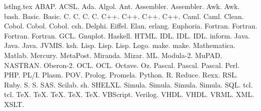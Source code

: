 \begin{filecontents}{lstlng.tex}
\lsttestlang ABAP.
\lsttestlang ACSL.
\lsttestlang Ada.
\lsttestlang Algol.
\lsttestlang Ant.
\lsttestlang Assembler.
\lsttestlang [x86masm]Assembler.
\lsttestlang [gnu]Awk.
\lsttestlang [POSIX]Awk.
\lsttestlang bash.
\lsttestlang Basic.
\lsttestlang [Visual]Basic.
\lsttestlang [ANSI]C.
\lsttestlang [Handel]C.
\lsttestlang [Objective]C.
\lsttestlang [Sharp]C.
\lsttestlang [ISO]C++.
\lsttestlang [ANSI]C++.
\lsttestlang [GNU]C++.
\lsttestlang [Visual]C++.
\lsttestlang [light]Caml.
\lsttestlang [Objective]Caml.
\lsttestlang Clean.
\lsttestlang [ibm]Cobol.
\lsttestlang [1974]Cobol.
\lsttestlang [1985]Cobol.
\lsttestlang csh.
\lsttestlang Delphi.
\lsttestlang Eiffel.
\lsttestlang Elan.
\lsttestlang erlang.
\lsttestlang Euphoria.
\lsttestlang Fortran.
\lsttestlang [77]Fortran.
\lsttestlang [90]Fortran.
\lsttestlang [95]Fortran.
\lsttestlang GCL.
\lsttestlang Gnuplot.
\lsttestlang Haskell.
\lsttestlang HTML.
\lsttestlang IDL.
\lsttestlang [empty]IDL.
\lsttestlang [CORBA]IDL.
\lsttestlang inform.
\lsttestlang Java.
\lsttestlang [empty]Java.
\lsttestlang [AspectJ]Java.
\lsttestlang JVMIS.
\lsttestlang ksh.
\lsttestlang Lisp.
\lsttestlang [empty]Lisp.
\lsttestlang [Auto]Lisp.
\lsttestlang Logo.
\lsttestlang [empty]make.
\lsttestlang [gnu]make.
\lsttestlang Mathematica.
\lsttestlang Matlab.
\lsttestlang Mercury.
\lsttestlang MetaPost.
\lsttestlang Miranda.
\lsttestlang Mizar.
\lsttestlang ML.
\lsttestlang Modula-2.
\lsttestlang MuPAD.
\lsttestlang NASTRAN.
\lsttestlang Oberon-2.
\lsttestlang [OMG]OCL.
\lsttestlang [decorative]OCL.
\lsttestlang Octave.
\lsttestlang Oz.
\lsttestlang [Borland6]Pascal.
\lsttestlang [Standard]Pascal.
\lsttestlang [XSC]Pascal.
\lsttestlang Perl.
\lsttestlang PHP.
\lsttestlang PL/I.
\lsttestlang Plasm.
\lsttestlang POV.
\lsttestlang Prolog.
\lsttestlang Promela.
\lsttestlang Python.
\lsttestlang R.
\lsttestlang Reduce.
\lsttestlang Rexx.
\lsttestlang RSL.
\lsttestlang Ruby.
\lsttestlang [PLUS]S.
\lsttestlang [empty]S.
\lsttestlang SAS.
\lsttestlang Scilab.
\lsttestlang sh.
\lsttestlang SHELXL.
\lsttestlang [67]Simula.
\lsttestlang [CII]Simula.
\lsttestlang [DEC]Simula.
\lsttestlang [IBM]Simula.
\lsttestlang SQL.
\lsttestlang [empty]tcl.
\lsttestlang [tk]tcl.
\lsttestlang [AlLaTeX]TeX.
\lsttestlang [common]TeX.
\lsttestlang [LaTeX]TeX.
\lsttestlang [plain]TeX.
\lsttestlang [primitive]TeX.
\lsttestlang VBScript.
\lsttestlang Verilog.
\lsttestlang [empty]VHDL.
\lsttestlang [AMS]VHDL.
\lsttestlang [97]VRML.
\lsttestlang XML.
\lsttestlang XSLT.
\end{filecontents}
\documentclass[a4j,papersize]{jsarticle}
\usepackage{listings,jlisting}

